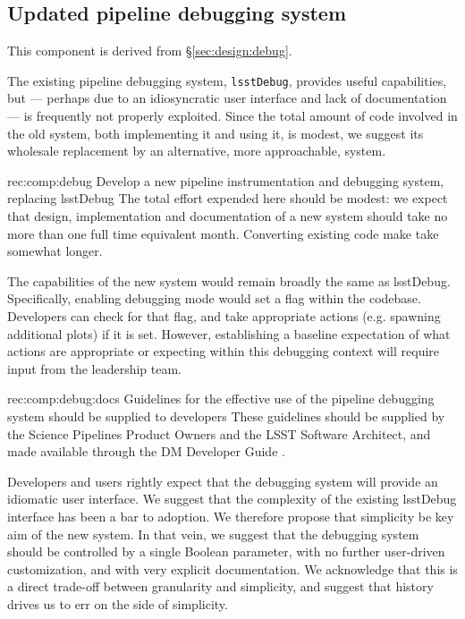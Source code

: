 \subsection{Updated pipeline debugging system}
\label{sec:comp:debug}

This component is derived from \S\ref{sec:design:debug}.

The existing pipeline debugging system, \texttt{lsstDebug}, provides useful
capabilities, but --- perhaps due to an idiosyncratic user interface and lack
of documentation --- is frequently not properly exploited. Since the total
amount of code involved in the old system, both implementing it and using it,
is modest, we suggest its wholesale replacement by an alternative, more
approachable, system.

\begin{recommendation}
    {rec:comp:debug}
    {Develop a new pipeline instrumentation and debugging system, replacing lsstDebug}
The total effort expended here should be modest: we expect that design,
implementation and documentation of a new system should take no more than one
full time equivalent month. Converting existing code make take somewhat
longer.
\end{recommendation}

The capabilities of the new system would remain broadly the same as lsstDebug.
Specifically, enabling debugging mode would set a flag within the codebase.
Developers can check for that flag, and take appropriate actions (e.g.
spawning additional plots) if it is set. However, establishing a baseline
expectation of what actions are appropriate or expecting within this debugging
context will require input from the leadership team.

\begin{recommendation}
    {rec:comp:debug:docs}
    {Guidelines for the effective use of the pipeline debugging system should be supplied to developers}
These guidelines should be supplied by the Science Pipelines Product Owners
and the LSST Software Architect, and made available through the DM Developer
Guide .
\end{recommendation}

Developers and users rightly expect that the debugging system will provide an
idiomatic user interface. We suggest that the complexity of the existing
lsstDebug interface has been a bar to adoption. We therefore propose that
simplicity be key aim of the new system. In that vein, we suggest that the
debugging system should be controlled by a single Boolean parameter, with no
further user-driven customization, and with very explicit documentation. We
acknowledge that this is a direct trade-off between granularity and simplicity,
and suggest that history drives us to err on the side of simplicity.

